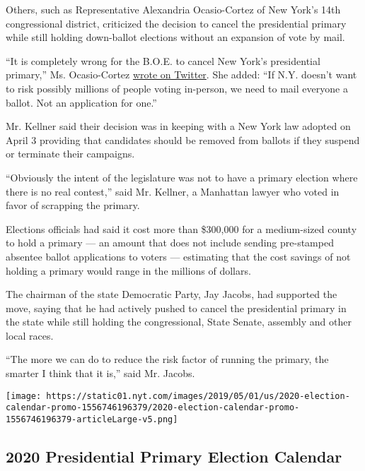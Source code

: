 Others, such as Representative Alexandria Ocasio-Cortez of New York's
14th congressional district, criticized the decision to cancel the
presidential primary while still holding down-ballot elections without
an expansion of vote by mail.

``It is completely wrong for the B.O.E. to cancel New York's
presidential primary,'' Ms. Ocasio-Cortez
\href{https://twitter.com/AOC/status/1254829322352893955}{wrote on
Twitter}. She added: ``If N.Y. doesn't want to risk possibly millions of
people voting in-person, we need to mail everyone a ballot. Not an
application for one.''

Mr. Kellner said their decision was in keeping with a New York law
adopted on April 3 providing that candidates should be removed from
ballots if they suspend or terminate their campaigns.

``Obviously the intent of the legislature was not to have a primary
election where there is no real contest,'' said Mr. Kellner, a Manhattan
lawyer who voted in favor of scrapping the primary.

Elections officials had said it cost more than \$300,000 for a
medium-sized county to hold a primary --- an amount that does not
include sending pre-stamped absentee ballot applications to voters ---
estimating that the cost savings of not holding a primary would range in
the millions of dollars.

The chairman of the state Democratic Party, Jay Jacobs, had supported
the move, saying that he had actively pushed to cancel the presidential
primary in the state while still holding the congressional, State
Senate, assembly and other local races.

``The more we can do to reduce the risk factor of running the primary,
the smarter I think that it is,'' said Mr. Jacobs.

\href{https://www.nytimes.com/interactive/2019/us/elections/2020-presidential-election-calendar.html}{}

\texttt{[image: https://static01.nyt.com/images/2019/05/01/us/2020-election-calendar-promo-1556746196379/2020-election-calendar-promo-1556746196379-articleLarge-v5.png]}

\hypertarget{2020-presidential-primary-election-calendar}{%
\subsection{2020 Presidential Primary Election
Calendar}\label{2020-presidential-primary-election-calendar}}

